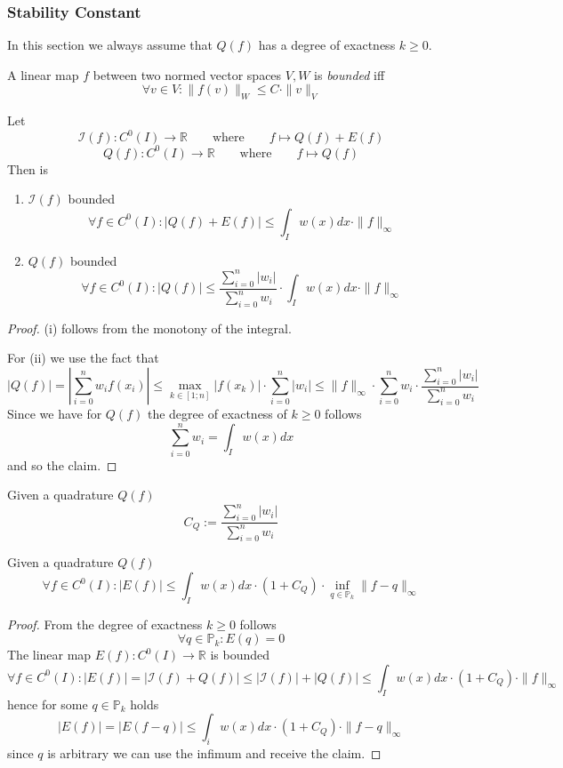 \subsubsection{Stability Constant}
In this section we always assume that \(Q(f)\) has a degree of exactness \(k \geq 0\).

A linear map \(f\) between two normed vector spaces \(V, W\) is \emph{bounded} iff
\[\forall v \in V: \|f(v)\|_W \leq C \cdot \|v\|_V\]

\begin{proposition}
   Let
   \[\mathcal{I}(f): C^0(I) \to \mathbb{R} \qquad\text{where}\qquad f \mapsto Q(f) + E(f)\]
   \[Q(f): C^0(I) \to \mathbb{R} \qquad\text{where}\qquad f \mapsto Q(f)\]
   Then is
   \begin{enumerate}[label=\roman*, align=Center]
      \item \(\mathcal{I}(f)\) bounded
         \[\forall f \in C^0(I): |Q(f) + E(f)|\leq \int_I w(x)dx \cdot \|f\|_\infty\]
      \item \(Q(f)\) bounded
         \[\forall f \in C^0(I): |Q(f)| \leq \frac{\sum_{i=0}^n |w_i|}{\sum_{i=0}^n w_i} \cdot \int_I w(x) dx \cdot \|f\|_\infty\]
   \end{enumerate}
\end{proposition}
\begin{proof}
   (i) follows from the monotony of the integral.

   For (ii) we use the fact that
   \[|Q(f)| = \left|\sum_{i=0}^n w_i f(x_i)\right| \leq \max_{k \in [1;n]} |f(x_k)| \cdot \sum_{i=0}^n |w_i| \leq \|f\|_\infty \cdot \sum_{i=0}^n w_i \cdot \frac{\sum_{i=0}^n |w_i|}{\sum_{i=0}^n w_i}\]
   Since we have for \(Q(f)\) the degree of exactness of \(k \geq 0\) follows
   \[\sum_{i=0}^n w_i = \int_I w(x) dx\]
   and so the claim.
\end{proof}

\begin{definition}
   Given a quadrature \(Q(f)\)
   \[C_Q := \frac{\sum_{i=0}^n |w_i|}{\sum_{i=0}^n w_i}\]
\end{definition}

\begin{theorem}\label{thm:newt_cot_err}
   Given a quadrature \(Q(f)\)
   \[\forall f \in C^0(I): |E(f)| \leq \int_I w(x)dx \cdot (1 + C_Q) \cdot \inf_{q \in \mathbb{P}_k} \|f - q\|_\infty\]
\end{theorem}
\begin{proof}
   From the degree of exactness \(k \geq 0\) follows
   \[\forall q \in \mathbb{P}_k: E(q) = 0\]
   The linear map \(E(f): C^0(I) \to \mathbb{R}\) is bounded
   \[\forall f \in C^0(I): |E(f)| = |\mathcal{I}(f) + Q(f)| \leq |\mathcal{I}(f)| + |Q(f)| \leq \int_I w(x) dx \cdot (1 + C_Q) \cdot \|f\|_\infty\]
   hence for some \(q \in \mathbb{P}_k\) holds
   \[|E(f)| = |E(f-q)| \leq \int_i w(x) dx \cdot (1 + C_Q) \cdot \|f - q\|_\infty\]
   since \(q\) is arbitrary we can use the infimum and receive the claim.
\end{proof}

